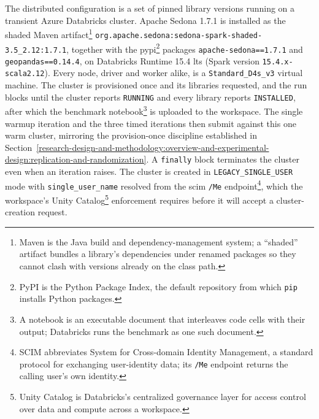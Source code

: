 The distributed configuration is a set of pinned library versions running on a transient Azure Databricks cluster. Apache Sedona 1.7.1 is installed as the shaded Maven artifact\footnote{Maven is the Java build and dependency-management system; a \enquote{shaded} artifact bundles a library's dependencies under renamed packages so they cannot clash with versions already on the class path.} \texttt{org.apache.\allowbreak sedona:sedona-spark-shaded-3.5\_2.12:1.7.1}, together with the \acrshort{pypi}\footnote{PyPI is the Python Package Index, the default repository from which \texttt{pip} installs Python packages.} packages \texttt{apache-sedona==1.7.1} and \texttt{geopandas==0.14.4}, on Databricks Runtime 15.4 \acrshort{lts} (Spark version \texttt{15.4.x-scala2.12}). Every node, driver and worker alike, is a \texttt{Standard\_D4s\_v3} virtual machine. The cluster is provisioned once and its libraries requested, and the run blocks until the cluster reports \texttt{RUNNING} and every library reports \texttt{INSTALLED}, after which the benchmark notebook\footnote{A notebook is an executable document that interleaves code cells with their output; Databricks runs the benchmark as one such document.} is uploaded to the workspace. The single warmup iteration and the three timed iterations then submit against this one warm cluster, mirroring the provision-once discipline established in Section~\ref{research-design-and-methodology:overview-and-experimental-design:replication-and-randomization}. A \texttt{finally} block terminates the cluster even when an iteration raises. The cluster is created in \texttt{LEGACY\_SINGLE\_USER} mode with \texttt{single\_user\_name} resolved from the \acrshort{scim} \texttt{/Me} endpoint\footnote{SCIM abbreviates System for Cross-domain Identity Management, a standard protocol for exchanging user-identity data; its \texttt{/Me} endpoint returns the calling user's own identity.}, which the workspace's Unity Catalog\footnote{Unity Catalog is Databricks's centralized governance layer for access control over data and compute across a workspace.} enforcement requires before it will accept a cluster-creation request.

